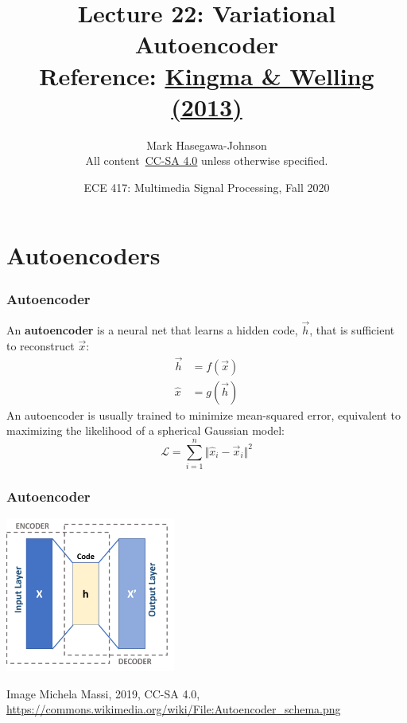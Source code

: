 \documentclass{beamer}
\title{Lecture 22: Variational Autoencoder\\Reference: \href{https://arxiv.org/pdf/1312.6114.pdf}{Kingma \& Welling (2013)}}
\author{Mark Hasegawa-Johnson\\All content~\href{https://creativecommons.org/licenses/by-sa/4.0/}{CC-SA 4.0} unless otherwise specified.}
\date{ECE 417: Multimedia Signal Processing, Fall 2020}
\institute{University of Illinois}
\begin{document}
\begin{frame}
  \maketitle
\end{frame}

\begin{frame}
  \tableofcontents
\end{frame}

\section{Autoencoders}
\setcounter{subsection}{1}

\begin{frame}
  \frametitle{Autoencoder}

  An {\bf autoencoder} is a neural net that learns a hidden code,
  $\vec{h}$, that is sufficient to reconstruct $\vec{x}$:
  \begin{align*}
    \vec{h} &= f(\vec{x})\\
    \hat{x} &= g(\vec{h})
  \end{align*}
  An autoencoder is usually trained to minimize mean-squared error,
  equivalent to maximizing the likelihood of a spherical Gaussian
  model:
  \begin{displaymath}
    {\mathcal L}=\sum_{i=1}^n \Vert\hat{x}_i-\vec{x}_i\Vert^2
  \end{displaymath}
\end{frame}

\begin{frame}
  \frametitle{Autoencoder}

  \centerline{\includegraphics[height=2in]{Autoencoder_schema.png}}
  \begin{tiny}
    Image Michela Massi, 2019, CC-SA 4.0,
    \url{https://commons.wikimedia.org/wiki/File:Autoencoder_schema.png}
  \end{tiny}
\end{frame}
\end{document}
